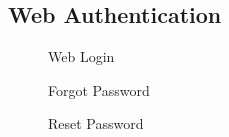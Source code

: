 \subsection{Web Authentication}
\begin{figure}[H]
	\begin{center}
		\caption{Web Login}
	\end{center}
\end{figure}
\begin{figure}[H]
	\begin{center}
		\caption{Forgot Password}
	\end{center}
\end{figure}
\begin{figure}[H]
	\begin{center}
		\caption{Reset Password}
	\end{center}
\end{figure}
\newpage
